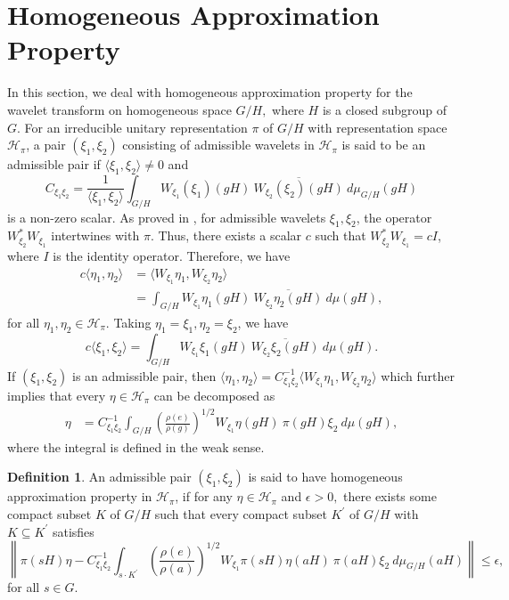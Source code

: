 \documentclass[11pt,reqno]{amsart}
\numberwithin{equation}{section}
\theoremstyle{definition}
\newtheorem{defi}[thm]{\sc Definition}
\begin{document}
\section{Homogeneous Approximation Property}
\noindent In this section, we deal with homogeneous approximation property for the wavelet transform on homogeneous space $G/H,$ where $H$ is a closed subgroup of $G$. For an  irreducible unitary representation $\pi$ of $G/H$ with representation space $\mathcal{H}_{\pi}$, 
a pair $ (\xi_1, \xi_2) $ consisting of admissible wavelets in $\mathcal{H}_{\pi}$ is said to be an admissible pair if
$\langle \xi_1, \xi_2 \rangle \neq 0$ and $$C_{\xi_1
\xi_2} = \frac{1}{\langle \xi_1,\xi_2 \rangle}\int_{G/H}W_{\xi_1}(\xi_1)(gH)\ \overline{W_{\xi_2}(\xi_2)(gH)}\ d\mu_{G/H}(gH) $$ is a non-zero scalar.
\noindent As proved in \cite[Theorem 2.1]{kam:12}, for admissible wavelets $\xi_1,\xi_2$,
 the operator  $ W_{\xi_2}^*W_{\xi_1}$ intertwines with $\pi$. Thus,   there exists a scalar $c$ such that $W_{\xi_2}^* W_{\xi_1} = cI$, where $I$ is the identity operator. Therefore, we have
\begin{align*}
c\langle \eta_1,\eta_2 \rangle
&= \langle W_{\xi_1}\eta_1,W_{\xi_2}\eta_2 \rangle\\
&=\int_{G/H}W_{\xi_1}\eta_1(gH)\ \overline{W_{\xi_2}\eta_2(gH)}\ d\mu(gH),
\end{align*}
for all $\eta_1,\eta_2 \in \mathcal{H}_{\pi} $. Taking $ \eta_1=\xi_1,  \eta_2=\xi_2$, 
 we have $$c\langle \xi_1,\xi_2 \rangle = \int_{G/H}W_{\xi_1}\xi_1(gH)\ \overline{W_{\xi_2}\xi_2(gH)}\ d\mu(gH).$$
If $(\xi_1,\xi_2)$ is an admissible pair, then 
$\langle \eta_1,\eta_2 \rangle= C_{\xi_1\xi_2}^{-1}\langle W_{\xi_1}\eta_1, W_{\xi_2}\eta_2 \rangle$ which further implies that every 
 $\eta\in \mathcal{H}_{\pi}$ can be decomposed as 
\begin{align*}
\eta &= C_{\xi_1\xi_2}^{-1}\int_{G/H}\left(\frac{\rho(e)}{\rho(g)}\right)^{1/2}W_{\xi_1}\eta(gH)\ \pi(gH)\xi_2\ d\mu(gH),
\end{align*}
where  the integral is defined in the weak sense.
\begin{defi}
An admissible pair $(\xi_1,\xi_2)$ is said to have homogeneous approximation property in $\mathcal{H}_{\pi}$, if for any $\eta \in \mathcal{H}_{\pi}$ and $\epsilon > 0,$ there exists some compact subset $K$ of $G/H$ such that every compact subset $K^{'}$ of $G/H$ with $K \subseteq K^{'}$ satisfies
$$\left\|\pi(sH)\eta - C_{\xi_1\xi_2}^{-1}\int_{s\cdot K^{'}}\left(\frac{\rho(e)}{\rho(a)}\right)^{1/2}W_{\xi_1}\pi(sH)\eta(aH)\ \pi(aH)\xi_2\ d\mu_{G/H}(aH)\right\|\leq \epsilon,$$
for all $s \in G.$
\end{defi}
\end{document}
